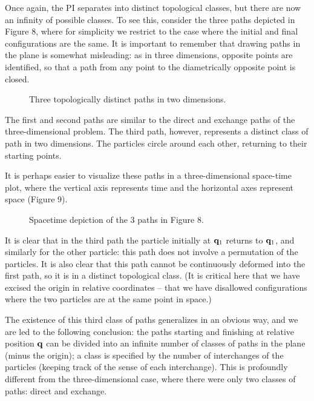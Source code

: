 \documentclass[12pt]{article}
\begin{document}
Once again, the PI separates into distinct topological classes, but
there are now an infinity of possible classes. To see this, consider
the three paths depicted in Figure 8,
where for simplicity we restrict to the
case where the initial and final configurations are the same. It
is important to remember that drawing paths in the plane is somewhat
misleading: as in three dimensions, 
opposite points are identified, so that a path
from any point to the diametrically opposite point is closed.

\begin{figure}[hb]
\epsfysize=5cm
\centerline{}
\caption{Three topologically distinct paths in two dimensions.}
\end{figure}


The first and second paths are similar to the direct and exchange
paths of the three-dimensional problem. The third path, however,
represents a distinct class of path in two dimensions. The particles
circle around each other, returning to their starting points.

It is perhaps easier to visualize these paths in a three-dimensional
space-time plot, where the vertical axis represents time and the
horizontal axes represent space (Figure 9).

\begin{figure}[hb]
\epsfysize=5cm
\centerline{}
\caption{Spacetime depiction of the 3 paths in Figure 8.}
\end{figure}


It is clear that in the third path the particle initially at ${\mathbf q}_1$ 
returns to ${\mathbf q}_1$, and similarly for the other particle: this path
does not involve a permutation of the particles. It is also
clear that this path cannot be continuously deformed
into the first path, so it is in a distinct topological class. (It
is critical here that we have excised the origin in relative
coordinates -- \ie that we have disallowed configurations where the two
particles are at the same point in space.)

The existence of this third class of paths generalizes in an obvious
way, and we are led to the following conclusion: the paths starting and
finishing at relative
position ${\mathbf q}$ can be divided into an infinite
number of classes of paths in the
plane (minus the origin); a class is specified by the number
of interchanges of
the particles (keeping track of the sense of each interchange). This
is profoundly different from the three-dimensional case, where there
were only two classes of paths: direct and exchange.
\end{document}
